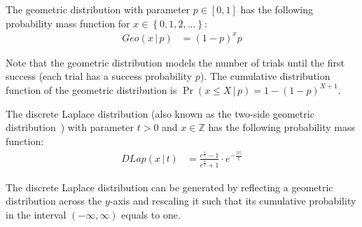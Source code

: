 \begin{definition}
    \label{def:GeometricDistribution}
    The geometric distribution with parameter $p \in \left[0,1\right] $ has the following probability mass function for $x\in \left\{0,1,2,\ldots\right\} $:
    \begin{equation}
        \begin{split}
            Geo \left( x \,|\, p \right) &=\left(1-p\right)^{x}p
        \end{split}
    \end{equation}
\end{definition}
Note that the geometric distribution models the number of trials until the first success (each trial has a success probability $p$).
The cumulative distribution function of the geometric distribution is $\Pr\left(x\leq X \,|\,p\right) =1-\left(1-p\right)^{X+1} $.


\begin{definition}
    \label{def:DiscreteLaplaceDistribution}
    The discrete Laplace distribution (also known as the two-side geometric distribution~\cite{ghosh2012universally}) with parameter $t>0$ and $x \in \mathbb{Z}$ has the following probability mass function:
    \begin{equation}
        \begin{split}
            DLap \left(x \,|\,t\right)&= \frac{e^{\frac{1}{t}}-1}{e^{\frac{1}{t}}+1} \cdot e^{- \frac{\left\lvert x\right\rvert }{t} }
        \end{split}
    \end{equation}
\end{definition}
The discrete Laplace distribution can be generated by reflecting a geometric distribution across the $y$-axis and rescaling it such that its cumulative probability in the interval $\left(-\infty ,\infty\right) $ equals to one.


